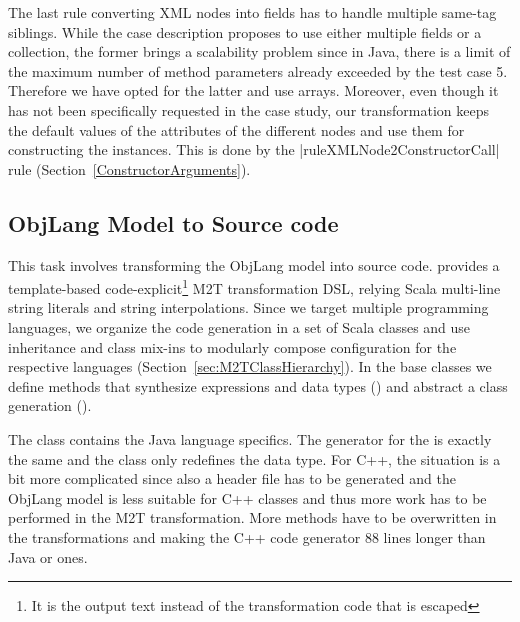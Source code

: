 The last rule converting XML nodes into fields has to handle multiple same-tag siblings.
While the case description proposes to use either multiple fields or a collection, the former brings a scalability problem since in Java, there is a limit of the maximum number of method parameters already exceeded by the test case 5.
Therefore we have opted for the latter and use arrays.
Moreover, even though it has not been specifically requested in the case study, our transformation keeps the default values of the attributes of the different nodes and use them for constructing the instances.
This is done by the \Scala|ruleXMLNode2ConstructorCall| rule (\Cf Section~\ref{ConstructorArguments}).

\subsection{ObjLang Model to Source code}

This task involves transforming the ObjLang model into source code.
\SIGMA provides a template-based code-explicit\footnote{It is the output text instead of the transformation code that is escaped} M2T transformation DSL, relying Scala multi-line string literals and string interpolations.
%
Since we target multiple programming languages, we organize the code generation in a set of Scala classes and use inheritance and class mix-ins to modularly compose configuration for the respective languages (\Cf Section~\ref{sec:M2TClassHierarchy}).
In the base classes we define methods that synthesize expressions and data types (\href{https://github.com/fikovnik/ttc14-fixml-sigma/blob/master/ttc14-fixml-base/src/fr/inria/spirals/sigma/ttc14/fixml/BaseObjLangMTT.scala}{}) and abstract a class generation (\href{https://github.com/fikovnik/ttc14-fixml-sigma/blob/master/ttc14-fixml-base/src/fr/inria/spirals/sigma/ttc14/fixml/BaseObjLang2Class.scala}{}).

The class \href{https://github.com/fikovnik/ttc14-fixml-sigma/blob/master/ttc14-fixml-base/src/fr/inria/spirals/sigma/ttc14/fixml/ObjLang2Java.scala}{} contains the Java language specifics.
The generator for the \Csharp is exactly the same and the class \href{https://github.com/fikovnik/ttc14-fixml-sigma/blob/master/ttc14-fixml-base/src/fr/inria/spirals/sigma/ttc14/fixml/ObjLang2CSharp.scala}{} only redefines the  data type.
For C++, the situation is a bit more complicated since also a header file has to be generated and the ObjLang model is less suitable for C++ classes and thus more work has to be performed in the M2T transformation.
More methods have to be overwritten in the transformations \href{https://github.com/fikovnik/ttc14-fixml-sigma/blob/master/ttc14-fixml-base/src/fr/inria/spirals/sigma/ttc14/fixml/ObjLang2CPPClassHeader.scala}{} and \href{https://github.com/fikovnik/ttc14-fixml-sigma/blob/master/ttc14-fixml-base/src/fr/inria/spirals/sigma/ttc14/fixml/ObjLang2CPPClassImpl.scala}{} making the C++ code generator 88 lines longer than Java or \Csharp ones.